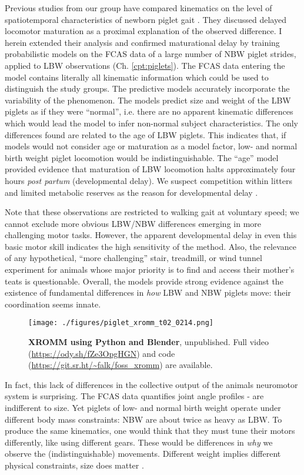 Previous studies from our group have compared kinematics on the level of spatiotemporal characteristics of newborn piglet gait \citep{VandenHole2018}.
They discussed delayed locomotor maturation as a proximal explanation of the observed difference.
I herein extended their analysis and confirmed maturational delay by training probabilistic models on the FCAS data of a large number of NBW piglet strides, applied to LBW observations (Ch. \ref{cpt:piglets}).
The FCAS data entering the model contains literally all kinematic information which could be used to distinguish the study groups.
The predictive models accurately incorporate the variability of the phenomenon.
The models predict size and weight of the LBW piglets as if they were ``normal'', i.e. there are no apparent kinematic differences which would lead the model to infer non-normal subject characteristics.
The only differences found are related to the age of LBW piglets.
This indicates that, if models would not consider age or maturation as a model factor, low- and normal birth weight piglet locomotion would be indistinguishable.
The ``age'' model provided evidence that maturation of LBW locomotion halts approximately four hours \emph{post partum} (developmental delay).
We suspect competition within litters and limited metabolic reserves as the reason for developmental delay \citep{VandenHole2019}.

Note that these observations are restricted to walking gait at voluntary speed; we cannot exclude more obvious LBW/NBW differences emerging in more challenging motor tasks.
However, the apparent developmental delay in even this basic motor skill indicates the high sensitivity of the method.
Also, the relevance of any hypothetical, ``more challenging'' stair, treadmill, or wind tunnel experiment for animals whose major priority is to find and access their mother's teats is questionable.
Overall, the models provide strong evidence against the existence of fundamental differences in \emph{how} LBW and NBW piglets move: their coordination seems innate.



\begin{figure}[p]
\centering
\texttt{[image: ./figures/piglet\_xromm\_t02\_0214.png]}
\caption{\label{fig:piglet_xromm}\textbf{XROMM using Python and Blender}, unpublished. Full video (\url{https://ody.sh/fZe3OpgHGN}) and code (\url{https://git.sr.ht/\~falk/foss\_xromm}) are available.}
\end{figure}

In fact, this lack of differences in the collective output of the animals neuromotor system is surprising.
The FCAS data quantifies joint angle profiles -  are indifferent to size.
Yet piglets of low- and normal birth weight operate under different body mass constraints: NBW are about twice as heavy as LBW.
To produce the same kinematics, one would think that they must tune their motors differently, like using different gears.
These would be differences in \emph{why} we observe the (indistinguishable) movements.
Different weight implies different physical constraints, size does matter \citep{Aerts2023}.

